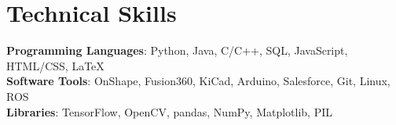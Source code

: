 \documentclass[letterpaper,11pt]{article}
\begin{document}
\section{Technical Skills}
 \begin{itemize}[leftmargin=0.15in, label={}]
    \small{\item{
     \textbf{Programming Languages}{: Python, Java, C/C++, SQL, JavaScript, HTML/CSS, LaTeX} \\
     \textbf{Software Tools}{: OnShape, Fusion360, KiCad, Arduino, Salesforce, Git, Linux, ROS} \\ 
     \textbf{Libraries}{: TensorFlow, OpenCV, pandas, NumPy, Matplotlib, PIL}
    }}
 \end{itemize}


\end{document}
